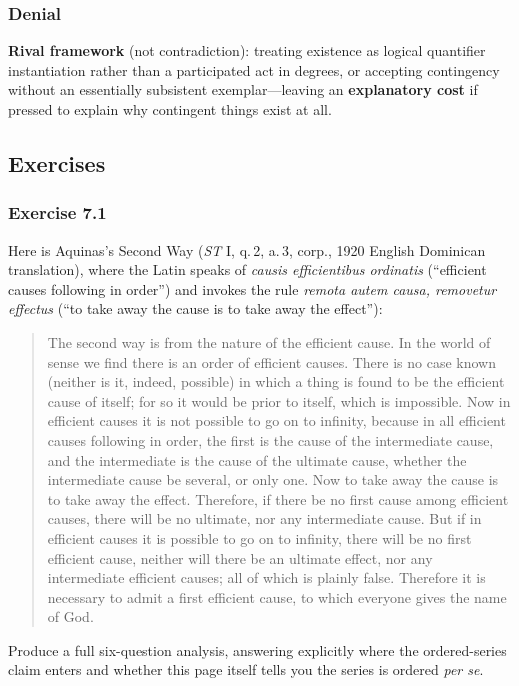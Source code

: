 \subsubsection*{Denial}

\textbf{Rival framework} (not contradiction): treating existence as logical quantifier instantiation rather than a participated act in degrees, or accepting contingency without an essentially subsistent exemplar---leaving an \textbf{explanatory cost} if pressed to explain why contingent things exist at all.

\subsection{Exercises}

\subsubsection*{Exercise 7.1}
Here is Aquinas's Second Way (\emph{ST} I, q.\,2, a.\,3, corp., 1920 English Dominican translation), where the Latin speaks of \emph{causis efficientibus ordinatis} (``efficient causes following in order'') and invokes the rule \emph{remota autem causa, removetur effectus} (``to take away the cause is to take away the effect''):

\begin{quote}
The second way is from the nature of the efficient cause. In the world of sense we find there is an order of efficient causes. There is no case known (neither is it, indeed, possible) in which a thing is found to be the efficient cause of itself; for so it would be prior to itself, which is impossible. Now in efficient causes it is not possible to go on to infinity, because in all efficient causes following in order, the first is the cause of the intermediate cause, and the intermediate is the cause of the ultimate cause, whether the intermediate cause be several, or only one. Now to take away the cause is to take away the effect. Therefore, if there be no first cause among efficient causes, there will be no ultimate, nor any intermediate cause. But if in efficient causes it is possible to go on to infinity, there will be no first efficient cause, neither will there be an ultimate effect, nor any intermediate efficient causes; all of which is plainly false. Therefore it is necessary to admit a first efficient cause, to which everyone gives the name of God.
\end{quote}

Produce a full six-question analysis, answering explicitly where the ordered-series claim enters and whether this page itself tells you the series is ordered \emph{per se}.

